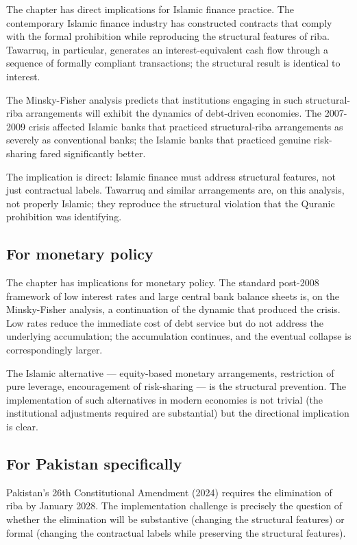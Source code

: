 The chapter has direct implications for Islamic finance practice.
The contemporary Islamic finance industry has constructed
contracts that comply with the formal prohibition while
reproducing the structural features of riba. Tawarruq, in
particular, generates an interest-equivalent cash flow through a
sequence of formally compliant transactions; the structural
result is identical to interest.

The Minsky-Fisher analysis predicts that institutions engaging in
such structural-riba arrangements will exhibit the dynamics of
debt-driven economies. The 2007-2009 crisis affected Islamic banks
that practiced structural-riba arrangements as severely as
conventional banks; the Islamic banks that practiced genuine
risk-sharing fared significantly better.

The implication is direct: Islamic finance must address structural
features, not just contractual labels. Tawarruq and similar
arrangements are, on this analysis, not properly Islamic; they
reproduce the structural violation that the Quranic prohibition
was identifying.

\subsection{For monetary policy}

The chapter has implications for monetary policy. The standard
post-2008 framework of low interest rates and large central bank
balance sheets is, on the Minsky-Fisher analysis, a continuation
of the dynamic that produced the crisis. Low rates reduce the
immediate cost of debt service but do not address the underlying
accumulation; the accumulation continues, and the eventual
collapse is correspondingly larger.

The Islamic alternative --- equity-based monetary arrangements,
restriction of pure leverage, encouragement of risk-sharing --- is
the structural prevention. The implementation of such alternatives
in modern economies is not trivial (the institutional adjustments
required are substantial) but the directional implication is clear.

\subsection{For Pakistan specifically}

Pakistan's 26th Constitutional Amendment (2024) requires the
elimination of riba by January 2028. The implementation challenge
is precisely the question of whether the elimination will be
substantive (changing the structural features) or formal (changing
the contractual labels while preserving the structural features).

